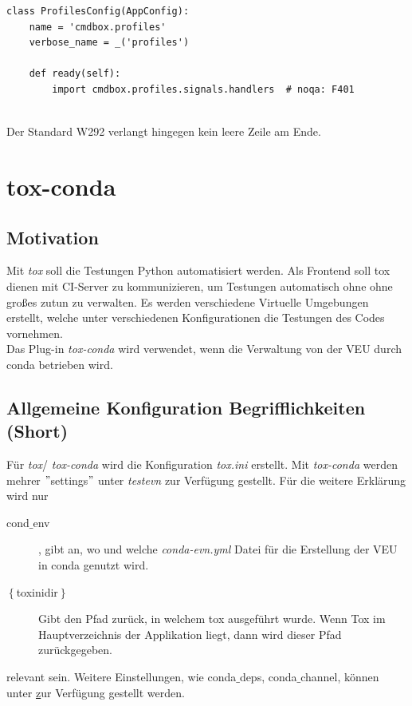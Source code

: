 \begin{lstlisting}[style=python, caption={Gutes Beispiel}, captionpos=b]
class ProfilesConfig(AppConfig):
    name = 'cmdbox.profiles'
    verbose_name = _('profiles')

    def ready(self):
        import cmdbox.profiles.signals.handlers  # noqa: F401
        
\end{lstlisting}
Der Standard W292 verlangt hingegen kein leere Zeile am Ende.

\section{tox-conda}

\subsection{Motivation}
Mit \textit{tox} soll die Testungen Python automatisiert werden. Als Frontend soll tox dienen mit CI-Server zu kommunizieren, um Testungen automatisch ohne ohne großes zutun zu verwalten. Es werden verschiedene Virtuelle Umgebungen erstellt, welche unter verschiedenen Konfigurationen die Testungen des Codes vornehmen.\\

Das Plug-in \textit{tox-conda} wird verwendet, wenn die Verwaltung von der \gls{VEU} durch conda betrieben wird.


\subsection{Allgemeine Konfiguration Begrifflichkeiten (Short)} 
Für \textit{tox}/ \textit{tox-conda} wird die Konfiguration \textit{tox.ini} erstellt. Mit \textit{tox-conda} werden mehrer $"$settings$"$ unter \textit{testevn} zur Verfügung gestellt. Für die weitere Erklärung wird nur
\begin{description}
	\item[cond$\_$env], gibt an, wo und welche \textit{conda-evn.yml} Datei für die Erstellung der \gls{VEU} in conda genutzt wird.
	\item[$\left\lbrace \right. $toxinidir$\left.\right\rbrace$] Gibt den Pfad zurück, in welchem tox ausgeführt wurde. Wenn Tox im Hauptverzeichnis der Applikation liegt, dann wird dieser Pfad zurückgegeben.
\end{description}
relevant sein. Weitere Einstellungen, wie conda$\_$deps, conda$\_$channel, können unter \href{https://github.com/tox-dev/tox-conda} zur Verfügung gestellt werden.

